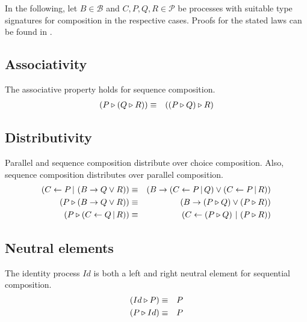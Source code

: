 In the following, let $B \in \mathcal{B}$ and $C, P, Q, R \in \mathcal{P}$ be processes with suitable type signatures for composition in the respective cases. Proofs for the stated laws can be found in .

\vspace*{-0.75em}
\subsection{Associativity}
\vspace*{-0.75em}
The associative property holds for sequence composition.
\vspace*{-0.75em}
\begin{eqnarray*}
  \left( P \triangleright \left( Q \triangleright R \right) \right) & \equiv & \left( \left( P \triangleright Q \right) \triangleright R \right)
\end{eqnarray*}
\vspace*{-0.75em}

\subsection{Distributivity}
\vspace*{-0.75em}
Parallel and sequence composition distribute over choice composition. Also, sequence composition distributes over parallel composition.
\vspace*{-0.75em}
\begin{eqnarray*}
  \left( C \gets P \, | \, \left( B \to Q \vee R \right) \right) & \equiv & \left( B \to \left( C \gets P \, | \, Q \right) \vee \left( C \gets P \, | \, R \right) \right) \\
  \left( P \triangleright \left( B \to Q \vee R \right) \right) & \equiv & \left( B \to \left( P \triangleright Q \right) \vee \left( P \triangleright R \right) \right) \\
  \left( P \triangleright \left( C \gets Q \, | \, R \right) \right) & \equiv & \left( C \gets \left( P \triangleright Q \right) \, | \, \left( P \triangleright R \right) \right)
\end{eqnarray*}
\vspace*{-0.75em}

\subsection{Neutral elements}
\vspace*{-0.75em}
The identity process $Id$ is both a left and right neutral element for sequential composition.
\vspace*{-1.5em}
\begin{eqnarray*}
  \left( Id \triangleright P \right) & \equiv & P \\
  \left( P \triangleright Id \right) & \equiv & P
\end{eqnarray*}
\vspace*{-0.75em}

